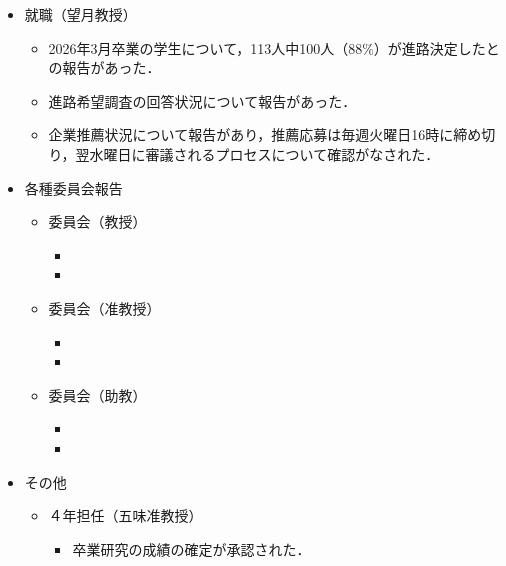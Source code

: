 \documentclass[10.5pt,a4paper]{jsarticle}
\begin{document}
\begin{enumerate}[label=\arabic*：, leftmargin=2zw, labelsep=1zw, itemsep=1\baselineskip]
\begin{itemize}[label=・, leftmargin=1.5zw, itemsep=1\baselineskip]
		\item 就職（望月教授）
		\begin{itemize}[label=-, leftmargin=2zw, nosep]
			\item 2026年3月卒業の学生について，113人中100人（88\%）が進路決定したとの報告があった．
			\item 進路希望調査の回答状況について報告があった．
			\item 企業推薦状況について報告があり，推薦応募は毎週火曜日16時に締め切り，翌水曜日に審議されるプロセスについて確認がなされた．
		\end{itemize}

		\item 各種委員会報告 
		\begin{itemize}[label=-, leftmargin=2zw, nosep]
			\item 委員会（教授）
			\begin{itemize}
				\item 
				\item 
			\end{itemize}
			
			\item 委員会（准教授）
			\begin{itemize}
				\item 
				\item 
			\end{itemize}

			\item 委員会（助教）
			\begin{itemize}
				\item 
				\item 
			\end{itemize}

		\end{itemize}

		\item その他
		\begin{itemize}[label=-, leftmargin=2zw, nosep]
			\item ４年担任（五味准教授）
			\begin{itemize}
				\item 卒業研究の成績の確定が承認された．
			\end{itemize}

		\end{itemize}

	\end{itemize}



\end{enumerate}
\end{document}

